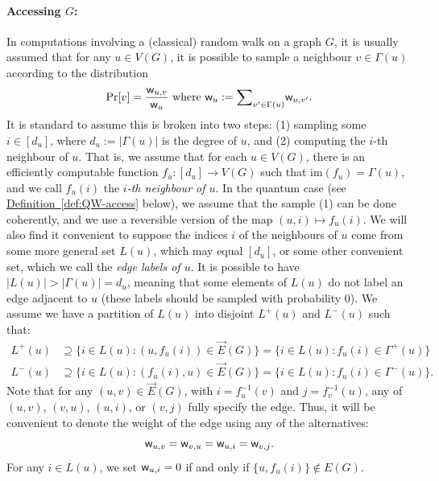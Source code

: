 \documentclass{theoretics}
\newcommand{\defin}[1]{\hyperref[def:#1]{Definition~\ref*{def:#1}}}
\renewcommand{\>}{\rangle}
\newcommand{\<}{\langle}
\renewcommand{\(}{\left(}
\renewcommand{\)}{\right)}
\def\w{{\sf w}}
\begin{document}
\paragraph{Accessing $G$:} In computations involving a (classical) random walk on a graph $G$, it is usually assumed that for any $u\in V(G)$, it is possible to sample a neighbour $v\in\Gamma(u)$ according to the distribution 
$$\Pr[v] = \frac{\w_{u,v}}{\w_u}\mbox{ where }\w_u:=\textstyle{\displaystyle\sum}_{ v'\in\Gamma(u)}\w_{u,v'}.$$
It is standard to assume this is broken into two steps: (1) sampling some $i\in [d_u]$, where $d_u:=|\Gamma(u)|$ is the degree of $u$, and (2) computing the $i$-th neighbour of $u$. That is, we assume that for each $u\in V(G)$, there is an efficiently computable function $f_u:[d_u]\rightarrow V(G)$ such that $\mathrm{im}(f_u)=\Gamma(u)$, and we call $f_u(i)$ the \emph{$i$-th neighbour of $u$}. In the quantum case (see \defin{QW-access} below), we assume that the sample (1) can be done coherently, and we use a reversible version of the map $(u,i)\mapsto f_u(i)$. We will also find it convenient to suppose the indices $i$ of the neighbours of $u$ come from some more general set $L(u)$, which may equal $[d_u]$, or some other convenient set, which we call the \emph{edge labels of $u$}. It is possible to have $|L(u)|>|\Gamma(u)|=d_u$, meaning that some elements of $L(u)$ do not label an edge adjacent to $u$ (these labels should be sampled with probability 0). 
We assume we have a partition of $L(u)$ into disjoint $L^+(u)$ and $L^-(u)$ such that:
\begin{equation*}
\begin{split}
L^+(u) &\supseteq \{i\in L(u): (u,f_u(i))\in\overrightarrow{E}(G)\} = \{i\in L(u):f_u(i)\in \Gamma^+(u)\}\\
L^-(u) &\supseteq \{i\in L(u): (f_u(i),u)\in\overrightarrow{E}(G)\} = \{i\in L(u):f_u(i)\in \Gamma^-(u)\}.
\end{split}
\end{equation*}
Note that for any $(u,v)\in\overrightarrow{E}(G)$, with $i=f_u^{-1}(v)$ and $j=f_v^{-1}(u)$, any of $(u,v)$, $(v,u)$, $(u,i)$, or $(v,j)$ fully specify the edge. Thus, it will be convenient to denote the weight of the edge using any of the alternatives:
$$\w_{u,v}=\w_{v,u}=\w_{u,i}=\w_{v,j}.$$
For any $i\in L(u)$, we set $\w_{u,i}=0$ if and only if $\{u,f_u(i)\}\not\in E(G)$.
\end{document}
